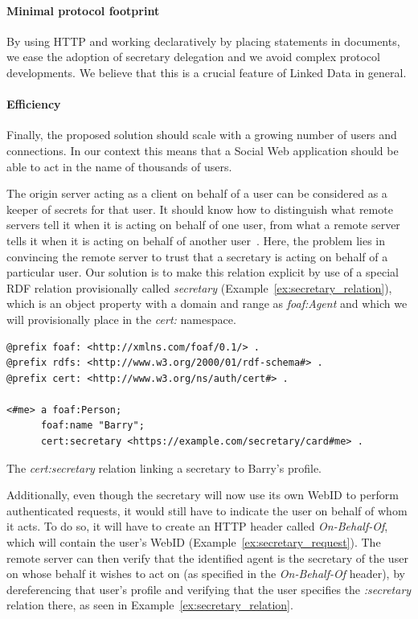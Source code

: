 \paragraph{Minimal protocol footprint} By using HTTP and working declaratively by placing statements in documents, we ease the adoption of secretary delegation and we avoid complex protocol developments. We believe that this is a crucial feature of Linked Data in general.

\paragraph{Efficiency} Finally, the proposed solution should scale with a growing number of users and connections. In our context this means that a Social Web application should be able to act in the name of thousands of users.

The origin server acting as a client on behalf of a user can be considered as a keeper of secrets for that user. It should know how to distinguish what remote servers tell it when it is acting on behalf of one user, from what a remote server tells it when it is acting on behalf of another user~\cite{tramp2012extending}. Here, the problem lies in convincing the remote server to trust that a secretary is acting on behalf of a particular user. Our solution is to make this relation explicit by use of a special RDF relation provisionally called \textit{secretary} (Example~\ref{ex:secretary_relation}), which is an object property with a domain and range as \textit{foaf:Agent} and which we will provisionally place in the \textit{cert:} namespace.\\

\begin{example}
\begin{verbatim}
@prefix foaf: <http://xmlns.com/foaf/0.1/> .
@prefix rdfs: <http://www.w3.org/2000/01/rdf-schema#> .
@prefix cert: <http://www.w3.org/ns/auth/cert#> .

<#me> a foaf:Person;
      foaf:name "Barry";
      cert:secretary <https://example.com/secretary/card#me> .
\end{verbatim}
\caption{The \textit{cert:secretary} relation linking a secretary to Barry's profile.}
\label{ex:secretary_relation}
\end{example}

Additionally, even though the secretary will now use its own WebID to perform authenticated requests, it would still have to indicate the user on behalf of whom it acts. To do so, it will have to create an HTTP header called \textit{On-Behalf-Of}, which will contain the user's WebID (Example~\ref{ex:secretary_request}). The remote server can then verify that the identified agent is the secretary of the user on whose behalf it wishes to act on (as specified in the \textit{On-Behalf-Of} header), by dereferencing that user's profile and verifying that the user specifies the \textit{:secretary} relation there, as seen in Example~\ref{ex:secretary_relation}.\\

